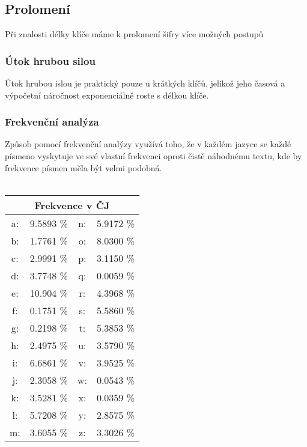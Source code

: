 \documentclass{article}
\begin{document}
\subsection{Prolomení}
Při znalosti délky klíče máme k prolomení šifry více možných postupů
\subsubsection{Útok hrubou silou}
Útok hrubou islou je praktický pouze u krátkých klíčů, jelikož jeho časová 
a výpočetní náročnost exponenciálně roste s délkou klíče.
\subsubsection{Frekvenční analýza}
Způsob pomocí frekvenční analýzy využívá toho, že v každém jazyce se každé 
písmeno vyskytuje ve své vlastní frekvenci oproti čistě náhodnému textu, kde
by frekvence písmen měla být velmi podobná.
\\\\

\begin{tabular}{|c c| c c|}
    \hline
    \multicolumn{4}{|c|}{Frekvence v ČJ} \\
    \hline
    a: & 9.5893 \% & n: & 5.9172 \% \\
    b: & 1.7761 \% & o: & 8.0300 \% \\
    c: & 2.9991 \% & p: & 3.1150 \% \\
    d: & 3.7748 \% & q: & 0.0059 \% \\
    e: & 10.904 \% & r: & 4.3968 \% \\
    f: & 0.1751 \% & s: & 5.5860 \% \\
    g: & 0.2198 \% & t: & 5.3853 \% \\
    h: & 2.4975 \% & u: & 3.5790 \% \\
    i: & 6.6861 \% & v: & 3.9525 \% \\
    j: & 2.3058 \% & w: & 0.0543 \% \\
    k: & 3.5281 \% & x: & 0.0359 \% \\
    l: & 5.7208 \% & y: & 2.8575 \% \\
    m: & 3.6055 \% & z: & 3.3026 \% \\
    \hline
\end{tabular}
\end{document}
